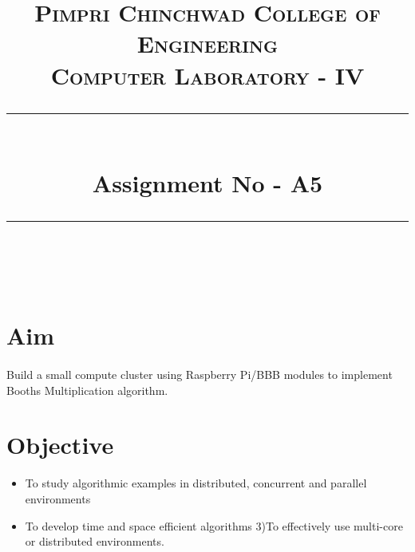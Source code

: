 \documentclass[a4paper,12pt]{article}
\title{
	\normalfont \normalsize 
	\textsc{Pimpri Chinchwad College of Engineering \\ 
		Computer Laboratory - IV} \\
	[10pt] 
	\rule{\linewidth}{0.5pt} \\[6pt] 
	\huge Assignment No - A5 \\
	\rule{\linewidth}{2pt}  \\[10pt]
}
\author{}
\date{\normalsize}
\newenvironment{codefont}{\fontfamily{ccr}\selectfont}{\par}
\begin{document}
\maketitle

\section{Aim}
	\paragraph{} Build a small compute cluster using Raspberry Pi/BBB modules to implement Booths Multiplication
	algorithm.
	
\section{Objective}
	\begin{itemize}
		\item To study algorithmic examples in distributed, concurrent and parallel environments  
		\item To develop time and space efficient algorithms  3)To effectively use multi-core or distributed environments. 
		
	\end{itemize}
	
\end{document}
